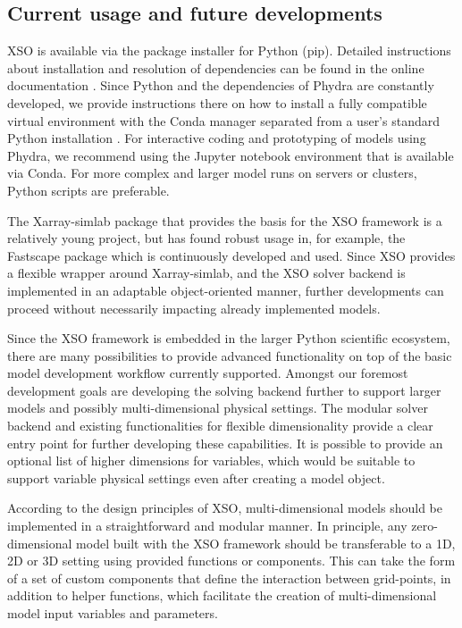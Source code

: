 \documentclass[gmd, manuscript]{copernicus}
\begin{document}
\subsection{Current usage and future developments}

XSO is available via the package installer for Python (pip). Detailed instructions about installation and resolution of dependencies can be found in the online documentation \citep{Post2023Xarray-simlab-ODE}. Since Python and the dependencies of Phydra are constantly developed, we provide instructions there on how to install a fully compatible virtual environment with the Conda manager separated from a user's standard Python installation \citep{Post2023Phydra}. For interactive coding and prototyping of models using Phydra, we recommend using the Jupyter notebook environment that is available via Conda. For more complex and larger model runs on servers or clusters, Python scripts are preferable.

The Xarray-simlab package that provides the basis for the XSO framework is a relatively young project, but has found robust usage in, for example, the Fastscape package \citep{Bovy2021Fastscape-lem/fastscape:V0.1.0beta3} which is continuously developed and used. Since XSO provides a flexible wrapper around Xarray-simlab, and the XSO solver backend is implemented in an adaptable object-oriented manner, further developments can proceed without necessarily impacting already implemented models.

Since the XSO framework is embedded in the larger Python scientific ecosystem, there are many possibilities to provide advanced functionality on top of the basic model development workflow currently supported. Amongst our foremost development goals are developing the solving backend further to support larger models and possibly multi-dimensional physical settings. The modular solver backend and existing functionalities for flexible dimensionality provide a clear entry point for further developing these capabilities. It is possible to provide an optional list of higher dimensions for variables, which would be suitable to support variable physical settings even after creating a model object.

According to the design principles of XSO, multi-dimensional models should be implemented in a straightforward and modular manner. In principle, any zero-dimensional model built with the XSO framework should be transferable to a 1D, 2D or 3D setting using provided functions or components. This can take the form of a set of custom components that define the interaction between grid-points, in addition to helper functions, which facilitate the creation of multi-dimensional model input variables and parameters.
\end{document}
